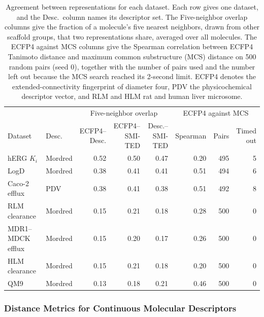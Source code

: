 \begin{table}[t]
\centering
\small
\setlength{\tabcolsep}{4pt}
\begin{adjustbox}{max width=\textwidth}
\begin{tabular}{llrrrrrr}
\toprule
 & & \multicolumn{3}{c}{Five-neighbor overlap} & \multicolumn{3}{c}{ECFP4 against MCS} \\
\cmidrule(lr){3-5}\cmidrule(lr){6-8}
Dataset & Desc. & \makecell{ECFP4--\\Desc.} & \makecell{ECFP4--\\SMI-TED} & \makecell{Desc.--\\SMI-TED} & Spearman & Pairs & \makecell{Timed\\out} \\
\midrule
hERG $K_i$ & Mordred & 0.52 & 0.50 & 0.47 & 0.20 & 495 & 5 \\
LogD & Mordred & 0.38 & 0.41 & 0.41 & 0.51 & 494 & 6 \\
Caco-2 efflux & PDV & 0.38 & 0.41 & 0.38 & 0.51 & 492 & 8 \\
RLM clearance & Mordred & 0.15 & 0.21 & 0.18 & 0.28 & 500 & 0 \\
MDR1--MDCK efflux & Mordred & 0.15 & 0.20 & 0.17 & 0.26 & 500 & 0 \\
HLM clearance & Mordred & 0.15 & 0.21 & 0.18 & 0.20 & 500 & 0 \\
QM9 & Mordred & 0.13 & 0.18 & 0.21 & 0.46 & 500 & 0 \\
\bottomrule
\end{tabular}
\end{adjustbox}
\caption[Agreement between representations per dataset.]{Agreement between representations for each dataset. Each row gives one dataset, and the Desc.\ column names its descriptor set. The Five-neighbor overlap columns give the fraction of a molecule's five nearest neighbors, drawn from other scaffold groups, that two representations share, averaged over all molecules. The ECFP4 against MCS columns give the Spearman correlation between ECFP4 Tanimoto distance and maximum common substructure (MCS) distance on 500 random pairs (seed 0), together with the number of pairs used and the number left out because the MCS search reached its 2-second limit. ECFP4 denotes the extended-connectivity fingerprint of diameter four, PDV the physicochemical descriptor vector, and RLM and HLM rat and human liver microsome.}
\label{tab:flaws:neighbor_overlap}
\end{table}


\subsubsection{Distance Metrics for Continuous Molecular Descriptors}

